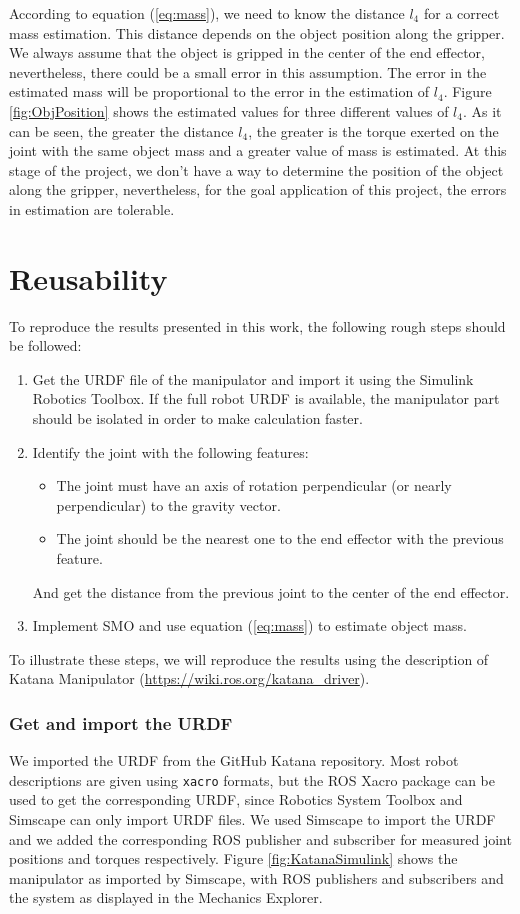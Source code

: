 \documentclass[a4paper, 10pt]{article}
\begin{document}
According to equation (\ref{eq:mass}), we need to know the distance $l_4$ for a correct mass estimation. This distance depends on the object position along the gripper. We always assume that the object is gripped in the center of the end effector, nevertheless, there could be a small error in this assumption. The error in the estimated mass will be proportional to the error in the estimation of $l_4$. Figure \ref{fig:ObjPosition} shows the estimated values for three different values of $l_4$. As it can be seen, the greater the distance $l_4$, the greater is the torque exerted on the joint with the same object mass and a greater value of mass is estimated. At this stage of the project, we don't have a way to determine the position of the object along the gripper, nevertheless, for the goal application of this project, the errors in estimation are tolerable. 


\section{Reusability}
\label{sec:reusability}
To reproduce the results presented in this work, the following rough steps should be followed:
\begin{enumerate}
\item Get the URDF file of the manipulator and import it using the Simulink Robotics Toolbox. If the full robot URDF is available, the manipulator part should be isolated in order to make calculation faster.
\item Identify the joint with the following features:
  \begin{itemize}
  \item The joint must have an axis of rotation perpendicular (or nearly perpendicular) to the gravity vector. 
  \item The joint should be the nearest one to the end effector with the previous feature. 
  \end{itemize}
  And get the distance from the previous joint to the center of the end effector.
\item Implement SMO and use equation (\ref{eq:mass}) to estimate object mass. 
\end{enumerate}

To illustrate these steps, we will reproduce the results using the description of Katana Manipulator (\url{https://wiki.ros.org/katana_driver}).

\subsubsection*{Get and import the URDF}
We imported the URDF from the GitHub Katana repository. Most robot descriptions are given using \texttt{xacro} formats, but the ROS Xacro package can be used to get the corresponding URDF, since Robotics System Toolbox and Simscape can only import URDF files. We used Simscape to import the URDF and we added the corresponding ROS publisher and subscriber for measured joint positions and torques respectively. Figure \ref{fig:KatanaSimulink} shows the manipulator as imported by Simscape, with ROS publishers and subscribers and the system as displayed in the Mechanics Explorer. 
\end{document}
